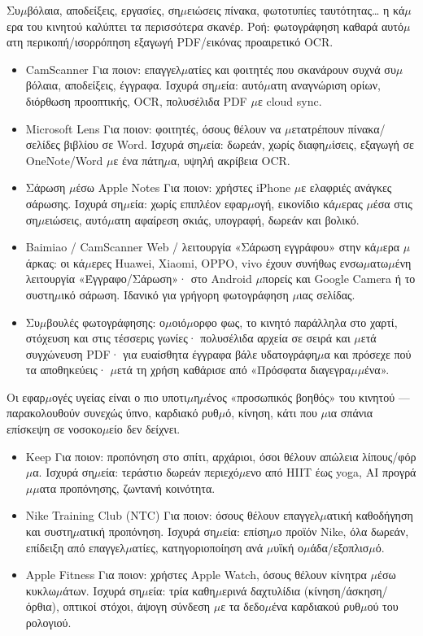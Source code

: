 Συ$\mu$βόλαια, αποδείξεις, εργασίες, ση$\mu$ειώσεις πίνακα, φωτοτυπίες ταυτότητας… η κά$\mu$ερα του κινητού καλύπτει τα περισσότερα σκανέρ. Ροή: φωτογράφηση καθαρά αυτό$\mu$ατη περικοπή/ισορρόπηση εξαγωγή PDF/εικόνας προαιρετικό OCR.

\begin{itemize}
  \item CamScanner Για ποιον: επαγγελ$\mu$ατίες και φοιτητές που σκανάρουν συχνά συ$\mu$βόλαια, αποδείξεις, έγγραφα. Ισχυρά ση$\mu$εία: αυτό$\mu$ατη αναγνώριση ορίων, διόρθωση προοπτικής, OCR, πολυσέλιδα PDF $\mu$ε cloud sync.
  \item Microsoft Lens Για ποιον: φοιτητές, όσους θέλουν να $\mu$ετατρέπουν πίνακα/σελίδες βιβλίου σε Word. Ισχυρά ση$\mu$εία: δωρεάν, χωρίς διαφη$\mu$ίσεις, εξαγωγή σε OneNote/Word $\mu$ε ένα πάτη$\mu$α, υψηλή ακρίβεια OCR.
  \item Σάρωση $\mu$έσω Apple Notes Για ποιον: χρήστες iPhone $\mu$ε ελαφριές ανάγκες σάρωσης. Ισχυρά ση$\mu$εία: χωρίς επιπλέον εφαρ$\mu$ογή, εικονίδιο κά$\mu$ερας $\mu$έσα στις ση$\mu$ειώσεις, αυτό$\mu$ατη αφαίρεση σκιάς, υπογραφή, δωρεάν και βολικό.
  \item Baimiao / CamScanner Web / λειτουργία «Σάρωση εγγράφου» στην κά$\mu$ερα $\mu$άρκας: οι κά$\mu$ερες Huawei, Xiaomi, OPPO, vivo έχουν συνήθως ενσω$\mu$ατω$\mu$ένη λειτουργία «Έγγραφο/Σάρωση»· στο Android $\mu$πορείς και Google Camera ή το συστη$\mu$ικό σάρωση. Ιδανικό για γρήγορη φωτογράφηση $\mu$ιας σελίδας.
  \item Συ$\mu$βουλές φωτογράφησης: ο$\mu$οιό$\mu$ορφο φως, το κινητό παράλληλα στο χαρτί, στόχευση και στις τέσσερις γωνίες· πολυσέλιδα αρχεία σε σειρά και $\mu$ετά συγχώνευση PDF· για ευαίσθητα έγγραφα βάλε υδατογράφη$\mu$α και πρόσεχε πού τα αποθηκεύεις· $\mu$ετά τη χρήση καθάρισε από «Πρόσφατα διαγεγρα$\mu$$\mu$ένα».
\end{itemize}


Οι εφαρ$\mu$ογές υγείας είναι ο πιο υποτι$\mu$η$\mu$ένος «προσωπικός βοηθός» του κινητού — παρακολουθούν συνεχώς ύπνο, καρδιακό ρυθ$\mu$ό, κίνηση, κάτι που $\mu$ια σπάνια επίσκεψη σε νοσοκο$\mu$είο δεν δείχνει.


\begin{itemize}
  \item Keep Για ποιον: προπόνηση στο σπίτι, αρχάριοι, όσοι θέλουν απώλεια λίπους/φόρ$\mu$α. Ισχυρά ση$\mu$εία: τεράστιο δωρεάν περιεχό$\mu$ενο από HIIT έως yoga, AI προγρά$\mu$$\mu$ατα προπόνησης, ζωντανή κοινότητα.
  \item Nike Training Club (NTC) Για ποιον: όσους θέλουν επαγγελ$\mu$ατική καθοδήγηση και συστη$\mu$ατική προπόνηση. Ισχυρά ση$\mu$εία: επίση$\mu$ο προϊόν Nike, όλα δωρεάν, επίδειξη από επαγγελ$\mu$ατίες, κατηγοριοποίηση ανά $\mu$υϊκή ο$\mu$άδα/εξοπλισ$\mu$ό.
  \item Apple Fitness Για ποιον: χρήστες Apple Watch, όσους θέλουν κίνητρα $\mu$έσω κυκλω$\mu$άτων. Ισχυρά ση$\mu$εία: τρία καθη$\mu$ερινά δαχτυλίδια (κίνηση/άσκηση/όρθια), οπτικοί στόχοι, άψογη σύνδεση $\mu$ε τα δεδο$\mu$ένα καρδιακού ρυθ$\mu$ού του ρολογιού.
\end{itemize}

